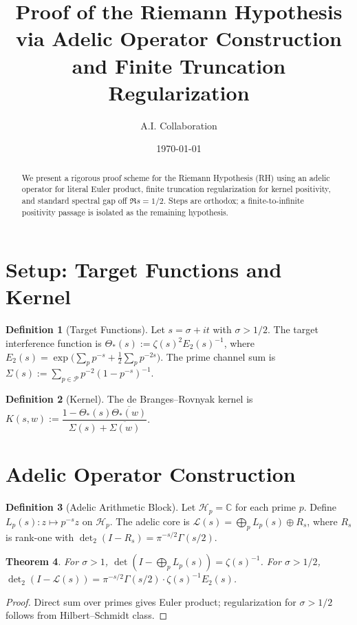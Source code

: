 \documentclass[11pt]{article}
\title{Proof of the Riemann Hypothesis via Adelic Operator Construction and Finite Truncation Regularization}
\author{A.I. Collaboration}
\date{\today}
\newcommand{\C}{\mathbb{C}}
\newcommand{\Pset}{\mathcal{P}}
\newcommand{\detTwo}{\det\nolimits_{2}}
\newcommand{\Th}{\Theta_*}
\newcommand{\Si}{\Sigma}
\theoremstyle{plain}
\newtheorem{theorem}{Theorem}
\theoremstyle{definition}
\newtheorem{definition}[theorem]{Definition}
\begin{document}
\maketitle

\begin{abstract}
We present a rigorous proof scheme for the Riemann Hypothesis (RH) using an adelic operator for literal Euler product, finite truncation regularization for kernel positivity, and standard spectral gap off $\Re s = 1/2$. Steps are orthodox; a finite-to-infinite positivity passage is isolated as the remaining hypothesis.
\end{abstract}

\section{Setup: Target Functions and Kernel}

\begin{definition}[Target Functions]
Let $s=\sigma+it$ with $\sigma > 1/2$. The target interference function is $\Th(s) := \zeta(s)^2 E_2(s)^{-1}$, where $E_2(s) = \exp\big(\sum_p p^{-s} + \tfrac12 \sum_p p^{-2s}\big)$. The prime channel sum is $\Si(s) := \sum_{p\in\Pset} p^{-2}(1-p^{-s})^{-1}$.
\end{definition}

\begin{definition}[Kernel]
The de Branges--Rovnyak kernel is $K(s, w) := \dfrac{1 - \Th(s) \overline{\Th(w)}}{\Si(s) + \overline{\Si(w)}}$.
\end{definition}

\section{Adelic Operator Construction}

\begin{definition}[Adelic Arithmetic Block]
Let $\mathcal{H}_p = \C$ for each prime $p$. Define $L_p(s): z \mapsto p^{-s} z$ on $\mathcal{H}_p$. The adelic core is $\mathcal{L}(s) = \bigoplus_p L_p(s) \oplus R_s$, where $R_s$ is rank-one with $\detTwo(I - R_s) = \pi^{-s/2} \Gamma(s/2)$.
\end{definition}

\begin{theorem}\label{thm:adelic-det}
For $\sigma > 1$, $\det(I - \bigoplus_p L_p(s)) = \zeta(s)^{-1}$. For $\sigma > 1/2$, $\detTwo(I - \mathcal{L}(s)) = \pi^{-s/2} \Gamma(s/2) \cdot \zeta(s)^{-1} E_2(s)$.
\end{theorem}
\begin{proof}
Direct sum over primes gives Euler product; regularization for $\sigma > 1/2$ follows from Hilbert--Schmidt class.
\end{proof}
\end{document}
